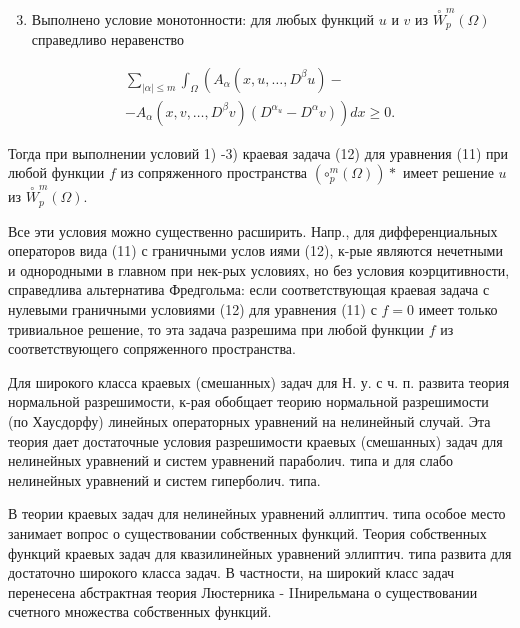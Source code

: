 \documentclass[10pt]{article}
\begin{document}
\begin{enumerate}

  \setcounter{enumi}{2}

  \item Выполнено условие монотонности: для любых функций $u$ и $v$ из $\stackrel{\circ}{W}_{p}^{m}(\Omega)$ справедливо неравенство

\end{enumerate}



\[

\begin{gathered}

\sum_{|\alpha| \leqslant m} \int_{\Omega}\left(A_{\alpha}\left(x, u, \ldots, D^{\beta} u\right)-\right. \\

\left.-A_{\alpha}\left(x, v, \ldots, D^{\beta} v\right)\left(D^{\alpha_{u}}-D^{\alpha} v\right)\right) d x \geqslant 0 .

\end{gathered}

\]



Тогда при выполнении условий 1) -3) краевая задача (12) для уравнения (11) при любой функции $f$ из сопряженного пространства $\left(\mathscr{\circ}_{p}^{m}(\Omega)\right) *$ имеет решение $u$ из $\stackrel{\circ}{W}_{p}^{m}(\Omega)$.



Все эти условия можно существенно расширить. Напр., для дифференциальных операторов вида (11) с граничными услов иями (12), к-рые являются нечетными и однородными в главном при нек-рых условиях, но без условия коэрцитивности, справедлива альтернатива Фредгольма: если соответствующая краевая задача с нулевыми граничными условиями (12) для уравнения (11) с $f=0$ имеет только тривиальное решение, то эта задача разрешима при любой функции $f$ из соответствующего сопряженного пространства.



Для широкого класса краевых (смешанных) задач для Н. у. с ч. п. развита теория нормальной разрешимости, к-рая обобщает теорию нормальной разрешимости (по Хаусдорфу) линейных операторных уравнений на нелинейный случай. Эта теория дает достаточные условия разрешимости краевых (смешанных) задач для нелинейных уравнений и систем уравнений параболич. типа и для слабо нелинейных уравнений и систем гиперболич. типа.



В теории краевых задач для нелинейных уравнений әллиптич. типа особое место занимает вопрос о существовании собственных функций. Теория собственных функций краевых задач для квазилинейных уравнений эллиптич. типа развита для достаточно широкого класса задач. В частности, на широкий класс задач перенесена абстрактная теория Люстерника - IIнирельмана о существовании счетного множества собственных функций.
\end{document}
